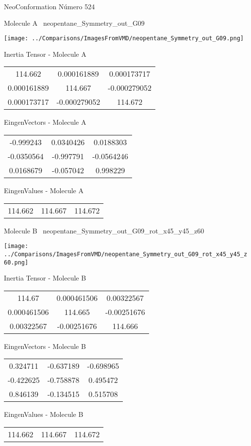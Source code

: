 \vtab[-3cm]
\begin{center}
{\large NeoConformation \tab Número 524}
\end{center}
\begin{multicols}{2}
\begin{center}

Molecule A \
neopentane\_Symmetry\_out\_G09

\texttt{[image: ../Comparisons/ImagesFromVMD/neopentane\_Symmetry\_out\_G09.png]}

Inertia Tensor - Molecule A \\
\begin{tabular}{|c c c|}
114.662	 & 	0.000161889	 & 	0.000173717	 \\
0.000161889	 & 	114.667	 & 	-0.000279052	 \\
0.000173717	 & 	-0.000279052	 & 	114.672
\end{tabular}

\vtab
 EingenVectors - Molecule A     \\
\begin{tabular}{|c c c|}
-0.999243	 & 	0.0340426	 & 	0.0188303	 \\
-0.0350564	 & 	-0.997791	 & 	-0.0564246	 \\
0.0168679	 & 	-0.057042	 & 	0.998229
\end{tabular}

\vtab
 EingenValues - Molecule A     \\
\begin{tabular}{|c c c|}
114.662	 & 	114.667	 & 	114.672	 \\
\end{tabular}
\columnbreak

Molecule B \
neopentane\_Symmetry\_out\_G09\_rot\_x45\_y45\_z60

\texttt{[image: ../Comparisons/ImagesFromVMD/neopentane\_Symmetry\_out\_G09\_rot\_x45\_y45\_z60.png]}

Inertia Tensor - Molecule B \\
\begin{tabular}{|c c c|}
114.67	 & 	0.000461506	 & 	0.00322567	 \\
0.000461506	 & 	114.665	 & 	-0.00251676	 \\
0.00322567	 & 	-0.00251676	 & 	114.666
\end{tabular}

\vtab
 EingenVectors - Molecule B     \\
\begin{tabular}{|c c c|}
0.324711	 & 	-0.637189	 & 	-0.698965	 \\
-0.422625	 & 	-0.758878	 & 	0.495472	 \\
0.846139	 & 	-0.134515	 & 	0.515708
\end{tabular}

\vtab
 EingenValues - Molecule B     \\
\begin{tabular}{|c c c|}
114.662	 & 	114.667	 & 	114.672	 \\
\end{tabular}

\end{center}
\end{multicols}


